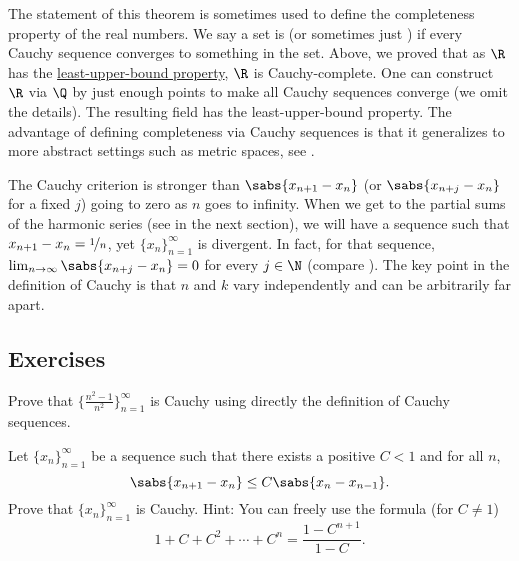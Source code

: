 \begin{remark}
The statement of this theorem is sometimes used to define the
completeness property of the real numbers.  We say a set is
\emph{} (or sometimes just \emph{})
if every Cauchy sequence converges to something in the set.
Above, we proved that
as $\R$ has the \hyperref[defn:lub]{least-upper-bound property}, $\R$ is 
Cauchy-complete.
One can construct $\R$ via
 $\Q$ by  just enough points to make all
Cauchy sequences converge (we omit the details).
The resulting field has the
least-upper-bound property.
The advantage of defining completeness via Cauchy
sequences is that it generalizes to
more abstract settings such as metric spaces, see .
\end{remark}

The Cauchy criterion is stronger than 
$\sabs{x_{n+1}-x_n}$ (or $\sabs{x_{n+j}-x_n}$ for a fixed $j$) going to zero as
$n$ goes to
infinity.  When we get to the partial sums of the harmonic series
(see  in the next section), we will have
a sequence such that $x_{n+1}-x_n = \nicefrac{1}{n}$,
yet $\{ x_n \}_{n=1}^\infty$ is divergent.
In fact, for that sequence,
$\lim_{n\to\infty} \sabs{x_{n+j}-x_n} = 0$ for
every $j \in \N$ (compare ).
The key point in the definition of Cauchy is that $n$ and $k$
vary independently and can be arbitrarily far apart.

\subsection{Exercises}

\begin{exercise}
Prove that $\bigl\{ \frac{n^2-1}{n^2} \bigr\}_{n=1}^\infty$ is Cauchy using directly the definition
of Cauchy sequences.
\end{exercise}

\begin{exercise}
Let $\{ x_n \}_{n=1}^\infty$ be a sequence such that
there exists a positive $C < 1$ and for all $n$,
\begin{equation*}
\sabs{x_{n+1} - x_n} \leq C \sabs{x_{n}-x_{n-1}} .
\end{equation*}
Prove that $\{ x_n \}_{n=1}^\infty$ is Cauchy.
Hint:  You can freely use the formula (for $C \not= 1$)
\begin{equation*}
1+ C+ C^2 + \cdots + C^n = \frac{1-C^{n+1}}{1-C}.
\end{equation*}
\end{exercise}

